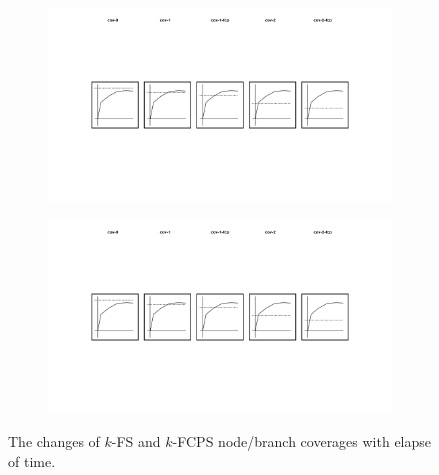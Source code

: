 \begin{figure}
\begin{subfigure}{0.19\textwidth}
  \end{subfigure}
  \begin{subfigure}{0.19\textwidth}
    \centering
    \includegraphics[width=\textwidth]{img/cov-2}
  \end{subfigure}
  \begin{subfigure}{0.19\textwidth}
    \centering
    \includegraphics[width=\textwidth]{img/cov-2-fcp}
  \end{subfigure}
  \caption{
    The changes of $k$-FS and $k$-FCPS node/branch coverages with elapse of
    time.
  }
  \label{fig:spec-cfg-id}
\end{figure}

